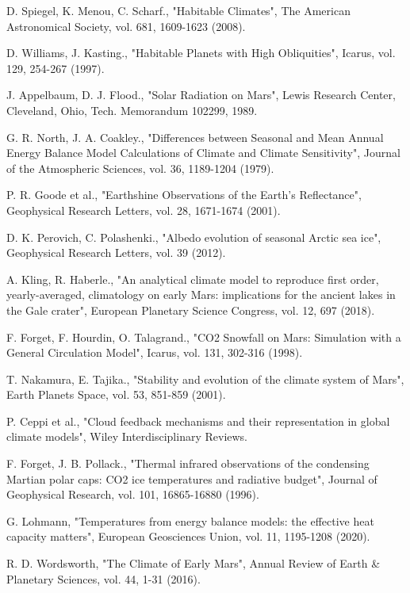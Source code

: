 \documentclass[12pt,onecolumn]{revtex4-2}    %
\begin{document}
%
\begin{thebibliography}{}

 D. Spiegel, K. Menou, C. Scharf., "Habitable Climates", The American Astronomical Society, vol. 681, 1609-1623 (2008).

 D. Williams, J. Kasting., "Habitable Planets with High Obliquities", Icarus, vol. 129, 254-267 (1997).

 J. Appelbaum, D. J. Flood., "Solar Radiation on Mars", Lewis Research Center, Cleveland, Ohio, Tech. Memorandum 102299, 1989.

 G. R. North, J. A. Coakley., "Differences between Seasonal and Mean Annual Energy Balance Model Calculations of Climate and Climate Sensitivity", Journal of the Atmospheric Sciences, vol. 36, 1189-1204 (1979).

 P. R. Goode et al., "Earthshine Observations of the Earth's Reflectance", Geophysical Research Letters, vol. 28, 1671-1674 (2001).

 D. K. Perovich, C. Polashenki., "Albedo evolution of seasonal Arctic sea ice", Geophysical Research Letters, vol. 39 (2012).

 A. Kling, R. Haberle., "An analytical climate model to reproduce first order, yearly-averaged, climatology on early Mars: implications for the ancient lakes in the Gale crater", European Planetary Science Congress, vol. 12, 697 (2018).

 F. Forget, F. Hourdin, O. Talagrand., "CO2 Snowfall on Mars: Simulation with a General Circulation Model", Icarus, vol. 131, 302-316 (1998).

 T. Nakamura, E. Tajika., "Stability and evolution of the climate system of Mars", Earth Planets Space, vol. 53, 851-859 (2001).

 P. Ceppi et al., "Cloud feedback mechanisms and their representation in global climate models", Wiley Interdisciplinary Reviews.

 F. Forget, J. B. Pollack., "Thermal infrared observations of the condensing Martian polar caps: CO2 ice temperatures and radiative budget", Journal of Geophysical Research, vol. 101, 16865-16880 (1996).

 G. Lohmann, "Temperatures from energy balance models: the effective heat capacity matters", European Geosciences Union, vol. 11, 1195-1208 (2020).

 R. D. Wordsworth, "The Climate of Early Mars", Annual Review of Earth \& Planetary Sciences, vol. 44, 1-31 (2016).

\end{thebibliography} 

\newpage
 
\clearpage
\end{document}
